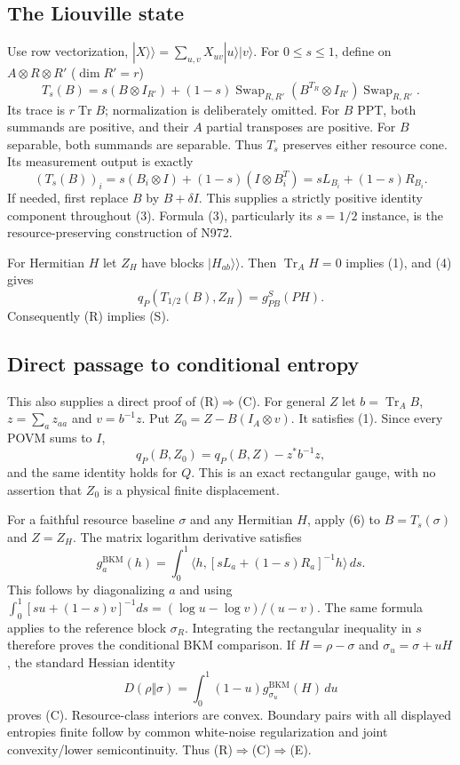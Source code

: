 \documentclass[11pt]{article}
\newcommand{\Tr}{\operatorname{Tr}}
\begin{document}
\subsection{The Liouville state}
Use row vectorization, $|X\rangle\!\rangle=\sum_{u,v}X_{uv}|u\rangle|v\rangle$.
For $0\leq s\leq1$, define on $A\otimes R\otimes R'$ ($\dim R'=r$)
\[
 T_s(B)=s(B\otimes I_{R'})+
 (1-s)\operatorname{Swap}_{R,R'}(B^{T_R}\otimes I_{R'})
                 \operatorname{Swap}_{R,R'}.                  \tag{3}
\]
Its trace is $r\Tr B$; normalization is deliberately omitted.
For $B$ PPT, both summands are positive, and their $A$ partial transposes
are positive. For $B$ separable, both summands are separable. Thus $T_s$
preserves either resource cone. Its measurement output is exactly
\[
 (T_s(B))_i=s(B_i\otimes I)+(1-s)(I\otimes B_i^T)
                         =sL_{B_i}+(1-s)R_{B_i}.               \tag{4}
\]
If needed, first replace $B$ by $B+\delta I$. This supplies a strictly
positive identity component throughout (3). Formula (3), particularly its
$s=1/2$ instance, is the resource-preserving construction of N972.

For Hermitian $H$ let $Z_H$ have blocks $|H_{ab}\rangle\!\rangle$.
Then $\Tr_AH=0$ implies (1), and (4) gives
\[
                  q_P(T_{1/2}(B),Z_H)=g^S_{PB}(PH).            \tag{5}
\]
Consequently (R) implies (S).

\subsection{Direct passage to conditional entropy}
This also supplies a direct proof of (R)$\Rightarrow$(C).
For general $Z$ let $b=\Tr_A B$, $z=\sum_a z_{aa}$ and $v=b^{-1}z$.
Put $Z_0=Z-B(I_A\otimes v)$. It satisfies (1). Since every POVM sums to $I$,
\[
 q_P(B,Z_0)=q_P(B,Z)-z^*b^{-1}z,                              \tag{6}
\]
and the same identity holds for $Q$. This is an exact rectangular gauge,
with no assertion that $Z_0$ is a physical finite displacement.

For a faithful resource baseline $\sigma$ and any Hermitian $H$, apply (6)
to $B=T_s(\sigma)$ and $Z=Z_H$. The matrix logarithm derivative satisfies
\[
 g^{\mathrm{BKM}}_a(h)
   =\int_0^1\langle h,[sL_a+(1-s)R_a]^{-1}h\rangle\,ds.       \tag{7}
\]
This follows by diagonalizing $a$ and using
$\int_0^1[su+(1-s)v]^{-1}ds=(\log u-\log v)/(u-v)$.
The same formula applies to the reference block $\sigma_R$.
Integrating the rectangular inequality in $s$ therefore proves the
conditional BKM comparison. If $H=\rho-\sigma$ and
$\sigma_u=\sigma+uH$, the standard Hessian identity
\[
 D(\rho\Vert\sigma)=\int_0^1(1-u)
                 g^{\mathrm{BKM}}_{\sigma_u}(H)\,du           \tag{8}
\]
proves (C). Resource-class interiors are convex. Boundary pairs with all
displayed entropies finite follow by common white-noise regularization and
joint convexity/lower semicontinuity. Thus (R)$\Rightarrow$(C)$\Rightarrow$(E).
\end{document}
